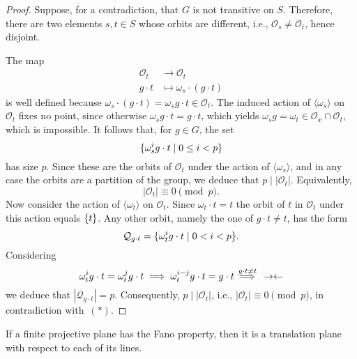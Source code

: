 \begin{proof}
    Suppose, for a contradiction, that $G$ is not transitive on $S$. Therefore, there are two elements $s,t\in S$ whose orbits are different, i.e., $\mathcal O_s\ne\mathcal O_t$, hence disjoint.

    The map 
    \begin{align*}
        \mathcal O_t&\to\mathcal O_t\\
        g\cdot t&\mapsto\omega_s\cdot(g\cdot t)
    \end{align*}
    is well defined because $\omega_s\cdot(g\cdot t)=\omega_sg\cdot t\in\mathcal O_t$. The induced action of $\langle\omega_s\rangle$ on $\mathcal O_t$ fixes no point, since otherwise $\omega_sg\cdot t=g\cdot t$, which yields $\omega_sg=\omega_t\in\mathcal O_x\cap\mathcal O_t$, which is impossible. It follows that, for $g\in G$, the set
    \[
        \{\omega_s^ig\cdot t\mid 0\le i<p\}
    \]
    has size $p$. Since these are the orbits of $\mathcal O_t$ under the action of $\langle\omega_s\rangle$, and in any case the orbits are a partition of the group, we deduce that $p\mid|\mathcal O_t|$. Equivalently,
    \[
        |\mathcal O_t|\equiv0\pmod p.\tag{$\ast$}
    \]
    Now consider the action of $\langle\omega_t\rangle$ on $\mathcal O_t$. Since $\omega_t\cdot t=t$ the orbit of $t$ in $\mathcal O_t$ under this action equals $\{t\}$. Any other orbit, namely the one of $g\cdot t\ne t$, has the form
    \[
        \mathcal Q_{g\cdot t}=\{\omega_t^ig\cdot t\mid 0<i<p\}.
    \]
    Considering
    \[
        \omega_t^ig\cdot t=\omega_t^jg\cdot t
            \implies\omega_t^{i-j}g\cdot t=g\cdot t
            \stackrel{g\cdot t\ne t}\implies{}\noend
    \]
    we deduce that $|\mathcal Q_{g\cdot t}|=p$. Consequently, $p\mid|\mathcal O_t|$, i.e., $|\mathcal O_t|\equiv0\pmod p$, in contradiction with~$(\ast)$.
    
\end{proof}

\begin{thm}\label{thm:Gleason} {\upshape[Gleason, 1956]}
    If a finite projective plane has the Fano property, then it is a translation plane with respect to each of its lines.
\end{thm}

